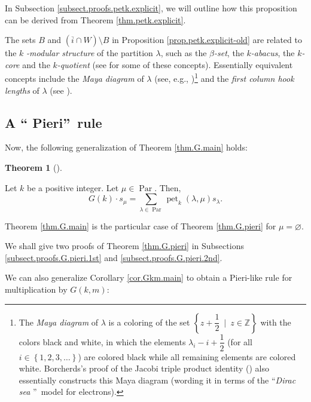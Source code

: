 \documentclass[numbers=enddot,12pt,final,onecolumn,notitlepage]{scrartcl}%
\theoremstyle{definition}
\newtheorem{theo}{Theorem}[section]
\newenvironment{theorem}[1][]
{\begin{theo}[#1]\begin{leftbar}}
{\end{leftbar}\end{theo}}
\let\sumnonlimits\sum
\renewcommand{\sum}{\sumnonlimits\limits}
\begin{document}
In Subsection \ref{subsect.proofs.petk.explicit}, we will outline how this
proposition can be derived from Theorem \ref{thm.petk.explicit}.

The sets $B$ and $\left(  \overline{i}\cap W\right)  \setminus B$ in
Proposition \ref{prop.petk.explicit-old} are related to the $k$%
\textit{-modular structure} of the partition $\lambda$, such as the $\beta
$\textit{-set}, the $k$\textit{-abacus}, the $k$\textit{-core} and the
$k$\textit{-quotient} (see \cite[\S \S 1--3]{Olsson93} for some of these
concepts). Essentially equivalent concepts include the \textit{Maya diagram}
of $\lambda$ (see, e.g., \cite[\S 3.3]{Crane18})\footnote{The \emph{Maya
diagram} of $\lambda$ is a coloring of the set $\left\{  z+\dfrac{1}{2}%
\ \mid\ z\in\mathbb{Z}\right\}  $ with the colors black and white, in which
the elements $\lambda_{i}-i+\dfrac{1}{2}$ (for all $i\in\left\{
1,2,3,\ldots\right\}  $) are colored black while all remaining elements are
colored white. Borcherds's proof of the Jacobi triple product identity
(\cite[\S 13.3]{Camero94}) also essentially constructs this Maya diagram
(wording it in terms of the \textquotedblleft\textit{Dirac sea}%
\textquotedblright\ model for electrons).} and the \textit{first column hook
lengths} of $\lambda$ (see \cite[Proposition (1.3)]{Olsson93}).

\subsection{\label{subsect.thms.pieri}A \textquotedblleft
Pieri\textquotedblright\ rule}

Now, the following generalization of Theorem \ref{thm.G.main} holds:

\begin{theorem}
\label{thm.G.pieri}Let $k$ be a positive integer. Let $\mu\in
\operatorname*{Par}$. Then,%
\[
G\left(  k\right)  \cdot s_{\mu}=\sum_{\lambda\in\operatorname*{Par}%
}\operatorname*{pet}\nolimits_{k}\left(  \lambda,\mu\right)  s_{\lambda}.
\]

\end{theorem}

Theorem \ref{thm.G.main} is the particular case of Theorem \ref{thm.G.pieri}
for $\mu=\varnothing$.

We shall give two proofs of Theorem \ref{thm.G.pieri} in Subsections
\ref{subsect.proofs.G.pieri.1st} and \ref{subsect.proofs.G.pieri.2nd}.

We can also generalize Corollary \ref{cor.Gkm.main} to obtain a Pieri-like
rule for multiplication by $G\left(  k,m\right)  $:
\end{document}
